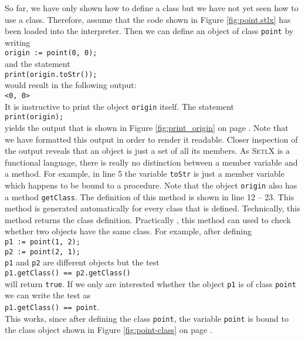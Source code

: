 So far, we have only shown how to define a class but we have not yet seen how to use a class.
Therefore, assume that the code shown in Figure \ref{fig:point.stlx} has been loaded into the
interpreter.   Then we can define an object of class \texttt{point} by writing
\\[0.2cm]
\hspace*{1.3cm}
\texttt{origin := point(0, 0);}
\\[0.2cm]
and the statement
\\[0.2cm]
\hspace*{1.3cm}
\texttt{print(origin.toStr());}
\\[0.2cm] 
would result in the following output:
\\[0.2cm]
\hspace*{1.3cm}
\texttt{<0, 0>}
\\[0.2cm]
It is instructive to print the object \texttt{origin} itself.  The statement 
\\[0.2cm]
\hspace*{1.3cm}
\texttt{print(origin);}
\\[0.2cm]
yields the output that is shown in Figure \ref{fig:print_origin} on page \pageref{fig:print_origin}.
Note that we have formatted this output in order to render it readable.  Closer inspection of the
output reveals that an object is just a set of all its members.  As \textsc{SetlX} is a functional
language, there is really no distinction between a member variable and a method.  For example, in
line 5 the variable \texttt{toStr} is just a member variable which happens to be bound to a
procedure.  Note that the object \texttt{origin} also has a method \texttt{getClass}.
The definition of this method is shown in line 12 -- 23.  This
method is generated automatically for every class that is defined.  Technically,
this method returns the class definition.  Practically , this method can used
to check whether two objects have the same class.  For example, after defining 
\\[0.2cm]
\hspace*{1.3cm} \texttt{p1 := point(1, 2);} \\
\hspace*{1.3cm} \texttt{p2 := point(2, 1);} 
\\[0.2cm]
\texttt{p1} and \texttt{p2} are different objects but the test
\\[0.2cm]
\hspace*{1.3cm}
\texttt{p1.getClass() == p2.getClass()}
\\[0.2cm]
will return \texttt{true}.  If we only are interested whether the object \texttt{p1} is of class
\texttt{point} we can write the test as
\\[0.2cm]
\hspace*{1.3cm}
\texttt{p1.getClass() == point}.
\\[0.2cm]
This works, since after defining the class \texttt{point}, the variable \texttt{point} is bound to
the class object shown in Figure \ref{fig:point-class} on page \pageref{fig:point-class}.


